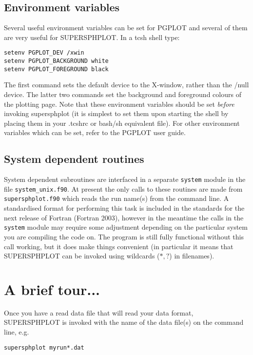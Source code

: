 \documentclass[a4paper,11pt]{article}
\begin{document}
\subsection{Environment variables}
 Several useful environment variables can be set for PGPLOT and several of them
are very useful for SUPERSPHPLOT. In a tcsh shell type:
\begin{verbatim}
setenv PGPLOT_DEV /xwin
setenv PGPLOT_BACKGROUND white
setenv PGPLOT_FOREGROUND black
\end{verbatim}
The first command sets the default device to the X-window, rather than the /null
device. The latter two commands set the background and foreground colours of the
plotting page. Note that these environment variables should be set \emph{before}
invoking supersphplot (it is simplest to set them upon starting the shell by placing
them in your .tcshrc or bash/sh equivalent file). For other environment
variables which can be set, refer to the PGPLOT user guide.

\subsection{System dependent routines}
 System dependent subroutines are interfaced in a separate \verb+system+ module in the file \verb+system_unix.f90+.
At present the only calls to these routines are made from \verb+supersphplot.f90+ which
reads the run name(s) from the command line. A standardised format for performing this
task is included in the standards for the next release of Fortran (Fortran 2003),
however in the meantime the calls in the \verb+system+ module may require some adjustment depending on the
particular system you are compiling the code on. The program is still fully
functional without this call working, but it does make things convenient (in particular it means that
SUPERSPHPLOT can be invoked using wildcards ($*,?$) in filenames).

\section{A brief tour...}
 Once you have a read data file that will read your data format,
SUPERSPHPLOT is invoked with the name of the data
file(s) on the command line, e.g.
\begin{verbatim}
supersphplot myrun*.dat
\end{verbatim}
\end{document}
